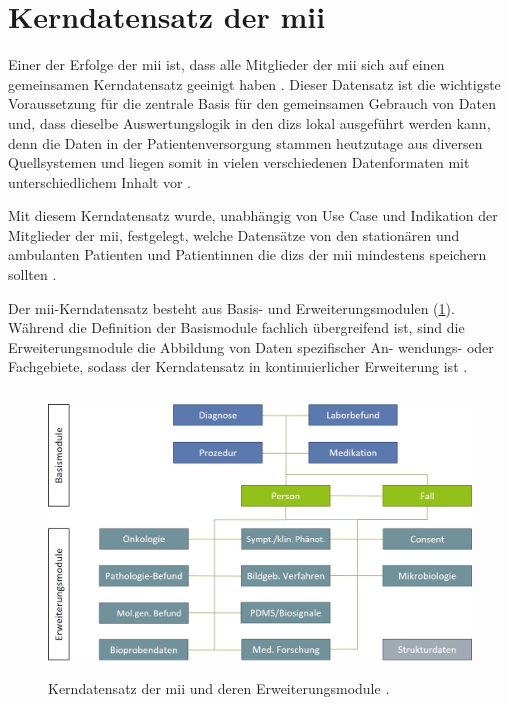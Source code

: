 \section{Kerndatensatz der \acs{mii}} \label{sec:miikdz}

Einer der Erfolge der \ac{mii} ist, dass alle Mitglieder der \ac{mii} sich auf einen gemeinsamen Kerndatensatz geeinigt haben \cite{telemedizin, miikdz}. Dieser Datensatz ist die wichtigste Voraussetzung für die zentrale Basis für den gemeinsamen Gebrauch von Daten und, dass dieselbe Auswertungslogik in den \acp{diz} lokal ausgeführt werden kann, denn die Daten in der Patientenversorgung stammen heutzutage aus diversen Quellsystemen und liegen somit in vielen verschiedenen Datenformaten mit unterschiedlichem Inhalt vor \cite{miikdz}. 

Mit diesem Kerndatensatz wurde, unabhängig von Use Case und Indikation der Mitglieder der \ac{mii}, festgelegt, welche Datensätze von den stationären und ambulanten Patienten und Patientinnen die \acp{diz} der \ac{mii} mindestens speichern sollten \cite{miikdz}.

Der \ac{mii}-Kerndatensatz besteht aus Basis- und Erweiterungsmodulen (\ref{fig:mii}). Während die Definition der Basismodule fachlich übergreifend ist, sind die Erweiterungsmodule die Abbildung von Daten spezifischer An- wendungs- oder Fachgebiete, sodass der Kerndatensatz in kontinuierlicher Erweiterung ist \cite{miikdz}.

\clearpage

\begin{figure}[ht]
	\centering
	\includegraphics[height=7.5cm]{figures/MIIModule}
	\caption[Kerndatensatz der \acs{mii}]{Kerndatensatz der \acs{mii} und deren Erweiterungsmodule \cite{miikdz}.}
	\label{fig:mii}
\end{figure}

